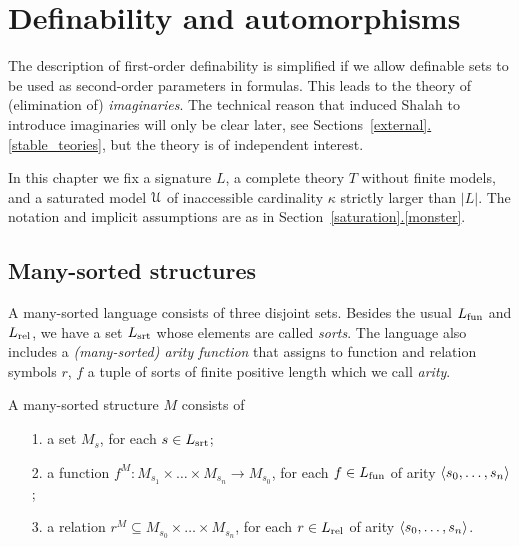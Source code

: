 \documentclass[creche.tex]{subfiles}
\begin{document}
\chapter{Definability and automorphisms}
\label{imaginary}


\def\medrel#1{\parbox[t]{6ex}{$\displaystyle\hfil #1$}}
\def\ceq#1#2#3{\parbox[t]{25ex}{$\displaystyle #1$}\medrel{#2}{$\displaystyle #3$}}


\def\vl{\mr}

The description of first-order definability is simplified if we allow definable sets to be used as second-order parameters in formulas. This leads to the theory of (elimination of) \textit{imaginaries}. The technical reason that induced Shalah to introduce imaginaries will only be clear later, see Sections~\hyperref[stable_teories]{\ref*{external}.\ref*{stable_teories}}, but the theory is of independent interest.

In this chapter we fix a signature $L$, a complete theory $T$ without finite models, and a saturated model $\EuScript U$ of inaccessible cardinality $\kappa$ strictly larger than $|L|$. The notation and implicit assumptions are as in Section~\hyperref[monster]{\ref*{saturation}.\ref*{monster}}.

\section{Many-sorted structures}
\label{many-sorted}
\def\Ar{{\rm Ar}}

A many-sorted language consists of three disjoint sets. Besides the usual $L_{\rm fun}$ and $L_{\rm rel}$, we have a set $L_{\rm srt}$  whose elements are called \emph{sorts}. The language also includes a \emph{(many-sorted) arity function} that assigns to function and relation symbols $r$, $f$ a tuple of sorts of finite positive length which we call \emph{arity}.

A many-sorted structure $M$ consists of
\begin{itemize}
\item[1.] a set $M_s$, for each $s\in L_{\rm srt}$;
\item[2.] a function $f^M:M_{s_1}\times\dots\times M_{s_n}\to M_{s_0}$, for each $f\in L_{\rm fun}$ of arity $\langle s_0,\dots,s_n\rangle$;
\item[3.] a relation $r^M\subseteq M_{s_0}\times\dots\times M_{s_n}$, for each $r\in L_{\rm rel}$ of arity $\langle s_0,\dots,s_n\rangle$.
\end{itemize}
\end{document}
